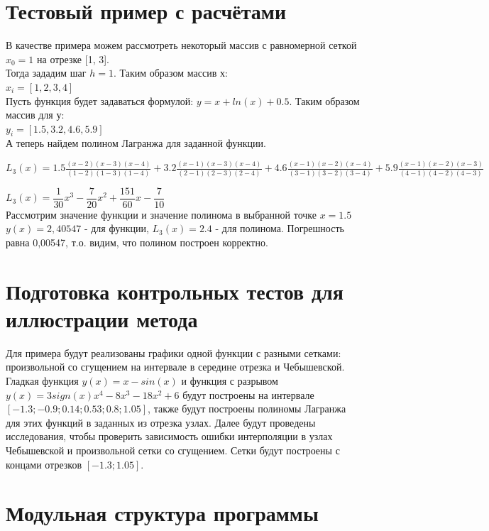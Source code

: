 \documentclass[a4paper]{article}
\begin{document}
\section{Тестовый пример с расчётами} 
В качестве примера  можем рассмотреть некоторый массив с равномерной сеткой  $ x_0=1 $ на отрезке [1, 3].\\
Тогда зададим шаг $ h = 1$. Таким образом массив х:\\
 $x_i = [1, 2, 3, 4]$\\
Пусть функция будет задаваться формулой:  $y = x+ln(x)+0.5$. Таким образом массив для у:\\
$ y_i = [1.5, 3.2, 4.6, 5.9]$\\
А теперь найдем полином Лагранжа для заданной функции. \\
\begin{flushright}
$ L_3(x) = 1.5 \frac{(x-2)(x-3)(x-4)}{(1-2)(1-3)(1-4)}+3.2\frac{(x-1)(x-3)(x-4)}{(2-1)(2-3)(2-4)}+4.6\frac{(x-1)(x-2)(x-4)}{(3-1)(3-2)(3-4)}+5.9\frac{(x-1)(x-2)(x-3)}{(4-1)(4-2)(4-3)}$\\ 
\begin{center}
$L_3(x)= \dfrac{1}{30}x^3-\dfrac{7}{20}x^2+\dfrac{151}{60}x-\dfrac{7}{10}$\\
Рассмотрим значение функции и значение полинома в выбранной точке $x = 1.5$\\
$y(x)= 2,40547$ - для функции, $L_3(x) =2.4$ - для полинома. Погрешность равна 0,00547, т.о. видим, что полином построен корректно.
\end{center}
\end{flushright}


 
\section{Подготовка контрольных тестов для иллюстрации метода} 
Для примера будут реализованы графики одной функции с разными сетками: произвольной со сгущением на интервале в середине отрезка и Чебышевской.
Гладкая функция $ y(x) = x - sin(x)$ и функция с разрывом  $ y(x) = 3sign(x)x^{4}-8x^{3}-18x^{2}+6$ будут построены на интервале $[-1.3;-0.9;0.14;0.53;0.8;1.05]$, также будут построены полиномы Лагранжа для этих функций в заданных из отрезка узлах. 
Далее будут проведены исследования, чтобы проверить зависимость ошибки интерполяции в узлах Чебышевской и произвольной сетки со сгущением. Сетки будут построены с концами отрезков $[-1.3; 1.05]$.
  
\newpage
\section{Модульная структура программы} 
 
\end{document}

